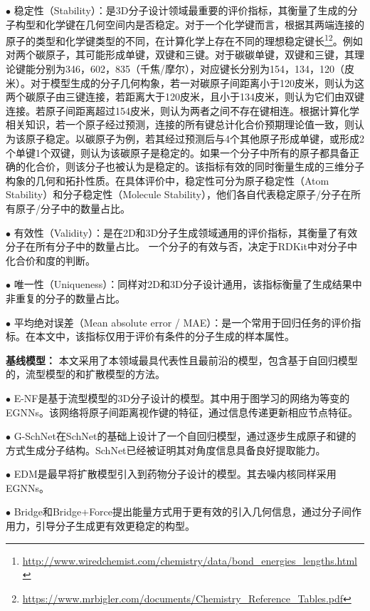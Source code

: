 $\bullet$ 稳定性（Stability）：是3D分子设计领域最重要的评价指标，其衡量了生成的分子构型和化学键在几何空间内是否稳定。对于一个化学键而言，根据其两端连接的原子的类型和化学键类型的不同，在计算化学上存在不同的理想稳定键长\footnote{\url{http://www.wiredchemist.com/chemistry/data/bond_energies_lengths.html}}\footnote{\url{https://www.mrbigler.com/documents/Chemistry_Reference_Tables.pdf}}。例如对两个碳原子，其可能形成单键，双键和三键。对于碳碳单键，双键和三键，其理论键能分别为346，602，835（千焦/摩尔），对应键长分别为154，134，120（皮米）。对于模型生成的分子几何构象，若一对碳原子间距离小于120皮米，则认为这两个碳原子由三键连接，若距离大于120皮米，且小于134皮米，则认为它们由双键连接。若原子间距离超过154皮米，则认为两者之间不存在键相连。根据计算化学相关知识，若一个原子经过预测，连接的所有键总计化合价预期理论值一致，则认为该原子稳定。以碳原子为例，若其经过预测后与4个其他原子形成单键，或形成2个单键1个双键，则认为该碳原子是稳定的。如果一个分子中所有的原子都具备正确的化合价，则该分子也被认为是稳定的。该指标有效的同时衡量生成的三维分子构象的几何和拓扑性质。在具体评价中，稳定性可分为原子稳定性（Atom Stability）和分子稳定性（Molecule Stability），他们各自代表稳定原子/分子在所有原子/分子中的数量占比。

$\bullet$ 有效性（Validity）：是在2D和3D分子生成领域通用的评价指标，其衡量了有效分子在所有分子中的数量占比。 一个分子的有效与否，决定于RDKit中对分子中化合价和度的判断。

$\bullet$ 唯一性（Uniqueness）：同样对2D和3D分子设计通用，该指标衡量了生成结果中非重复的分子的数量占比。

$\bullet$ 平均绝对误差（Mean absolute error / MAE）：是一个常用于回归任务的评价指标。在本文中，该指标仅用于评价有条件的分子生成的样本属性。

\textbf{基线模型：}
本文采用了本领域最具代表性且最前沿的模型，包含基于自回归模型的，流型模型的和扩散模型的方法。

$\bullet$ E-NF\cite{enf_satorras_21}是基于流型模型的3D分子设计的模型。其中用于图学习的网络为等变的EGNNs\cite{egnn_satorras_21}。该网络将原子间距离视作键的特征，通过信息传递更新相应节点特征。

$\bullet$ G-SchNet\cite{gschnet_wallach_19}在SchNet\cite{schnet_schutt_17}的基础上设计了一个自回归模型，通过逐步生成原子和键的方式生成分子结构。SchNet已经被证明其对角度信息具备良好提取能力。

$\bullet$ EDM\cite{edm_hoogeboom_22}是最早将扩散模型引入到药物分子设计的模型。其去噪内核同样采用EGNNs\cite{egnn_satorras_21}。

$\bullet$ Bridge和Bridge+Force\cite{diffpg_wu_22}提出能量方式用于更有效的引入几何信息，通过分子间作用力，引导分子生成更有效更稳定的构型。

